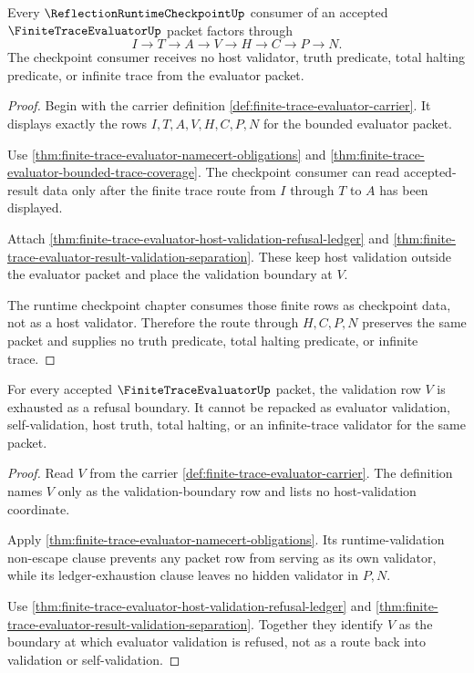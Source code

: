 \begin{theorem}
\label{thm:finite-trace-evaluator-checkpoint-consumer-route}
Every $\ReflectionRuntimeCheckpointUp$ consumer of an accepted
$\FiniteTraceEvaluatorUp$ packet factors through
$$
I \to T \to A \to V \to H \to C \to P \to N.
$$
The checkpoint consumer receives no host validator, truth predicate, total
halting predicate, or infinite trace from the evaluator packet.
\end{theorem}
\begin{proof}
Begin with the carrier definition
\autoref{def:finite-trace-evaluator-carrier}. It displays exactly the rows
$I,T,A,V,H,C,P,N$ for the bounded evaluator packet.

Use \autoref{thm:finite-trace-evaluator-namecert-obligations} and
\autoref{thm:finite-trace-evaluator-bounded-trace-coverage}. The checkpoint
consumer can read accepted-result data only after the finite trace route from
$I$ through $T$ to $A$ has been displayed.

Attach \autoref{thm:finite-trace-evaluator-host-validation-refusal-ledger} and
\autoref{thm:finite-trace-evaluator-result-validation-separation}. These keep
host validation outside the evaluator packet and place the validation boundary
at $V$.

The runtime checkpoint chapter consumes those finite rows as checkpoint data,
not as a host validator. Therefore the route through $H,C,P,N$ preserves the
same packet and supplies no truth predicate, total halting predicate, or
infinite trace.
\end{proof}

\begin{theorem}
\label{thm:finite-trace-evaluator-validation-boundary-exhaustion}
For every accepted $\FiniteTraceEvaluatorUp$ packet, the validation row $V$ is
exhausted as a refusal boundary. It cannot be repacked as evaluator validation,
self-validation, host truth, total halting, or an infinite-trace validator for
the same packet.
\end{theorem}
\begin{proof}
Read $V$ from the carrier
\autoref{def:finite-trace-evaluator-carrier}. The definition names $V$ only as
the validation-boundary row and lists no host-validation coordinate.

Apply \autoref{thm:finite-trace-evaluator-namecert-obligations}. Its
runtime-validation non-escape clause prevents any packet row from serving as
its own validator, while its ledger-exhaustion clause leaves no hidden
validator in $P,N$.

Use \autoref{thm:finite-trace-evaluator-host-validation-refusal-ledger} and
\autoref{thm:finite-trace-evaluator-result-validation-separation}. Together
they identify $V$ as the boundary at which evaluator validation is refused,
not as a route back into validation or self-validation.
\end{proof}

